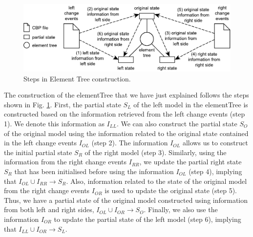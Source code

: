 \begin{figure}
    \centering
    \includegraphics[width=\linewidth]{TreeConstruction}
    \caption{Steps in Element Tree construction.}
    \label{fig:tree_construction}
\end{figure} 

The construction of the \textsf{elementTree} that we have just explained follows the steps shown in Fig. \ref{fig:tree_construction}. First, the partial
state $S_{L}$ of the left model in the \textsf{elementTree} is constructed based on the information retrieved from the left change events (step 1). We denote this information as $I_{LL}$. We can also construct the partial 
state $S_{O}$ of the original model using the information related to the original state contained in the left change events $I_{OL}$ (step 2). The information $I_{OL}$ allows us to construct the initial partial 
state $S_{R}$ of the right model 
(step 3). Similarly, using the information from the right change events $I_{RR}$, we update the partial right state $S_{R}$ that has been initialised before using the information $I_{OL}$ (step 4), implying that $I_{OL} \cup I_{RR} \rightarrow S_{R}$. Also, information related to the state of the original model from the right change events $I_{OR}$ is used to update the original state  (step 5). Thus, we have a partial state of the original model constructed using information from both left and right sides, $I_{OL} \cup I_{OR} \rightarrow S_{O}$. Finally, we also use the information $I_{OR}$ to update 
the partial state of the left model (step 6), implying that $I_{LL} \cup I_{OR} \rightarrow S_{L}$.  


